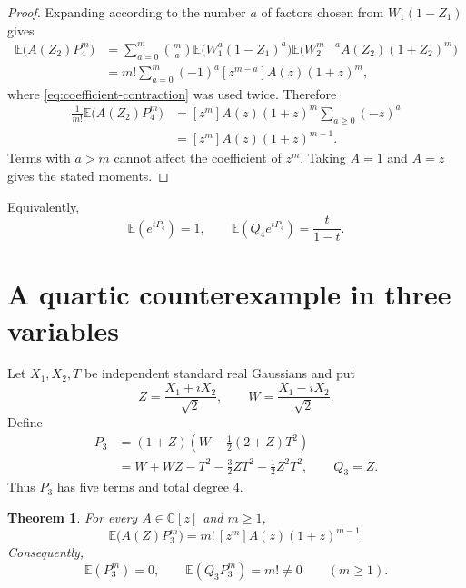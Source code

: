 \documentclass[11pt]{article}
\newcommand{\C}{\mathbb C}
\newcommand{\E}{\mathbb E}
\newtheorem{theorem}{Theorem}[section]
\theoremstyle{remark}
\begin{document}
\begin{proof}
Expanding according to the number $a$ of factors chosen from $W_1(1-Z_1)$ gives
\begin{align*}
\E\bigl(A(Z_2)P_4^m\bigr)
 &=\sum_{a=0}^m\binom ma
   \E\bigl(W_1^a(1-Z_1)^a\bigr)
   \E\bigl(W_2^{m-a}A(Z_2)(1+Z_2)^m\bigr)\\
 &=m!\sum_{a=0}^m(-1)^a
   [z^{m-a}]A(z)(1+z)^m,
\end{align*}
where \eqref{eq:coefficient-contraction} was used twice.  Therefore
\begin{align*}
\frac1{m!}\E\bigl(A(Z_2)P_4^m\bigr)
 &= [z^m]A(z)(1+z)^m\sum_{a\geq0}(-z)^a\\
 &= [z^m]A(z)(1+z)^{m-1}.
\end{align*}
Terms with $a>m$ cannot affect the coefficient of $z^m$.  Taking $A=1$ and $A=z$ gives the stated moments.
\end{proof}

Equivalently,
\begin{equation}\label{eq:egf-four}
  \E(e^{tP_4})=1,
  \qquad
  \E(Q_4e^{tP_4})=\frac{t}{1-t}.
\end{equation}

\section{A quartic counterexample in three variables}

Let $X_1,X_2,T$ be independent standard real Gaussians and put
\[
  Z=\frac{X_1+iX_2}{\sqrt2},\qquad
  W=\frac{X_1-iX_2}{\sqrt2}.
\]
Define
\begin{equation}\label{eq:P3}
\begin{split}
  P_3
  &=(1+Z)\left(W-\frac12(2+Z)T^2\right)\\
  &=W+WZ-T^2-\frac32ZT^2-\frac12Z^2T^2,
  \qquad Q_3=Z.
\end{split}
\end{equation}
Thus $P_3$ has five terms and total degree $4$.

\begin{theorem}\label{thm:three}
For every $A\in\C[z]$ and $m\geq1$,
\begin{equation}\label{eq:master-three}
  \E\bigl(A(Z)P_3^m\bigr)
  =m!\,[z^m]A(z)(1+z)^{m-1}.
\end{equation}
Consequently,
\begin{equation}\label{eq:counterexample-three}
  \E(P_3^m)=0,
  \qquad
  \E(Q_3P_3^m)=m!\neq0
  \qquad(m\geq1).
\end{equation}
\end{theorem}
\end{document}
